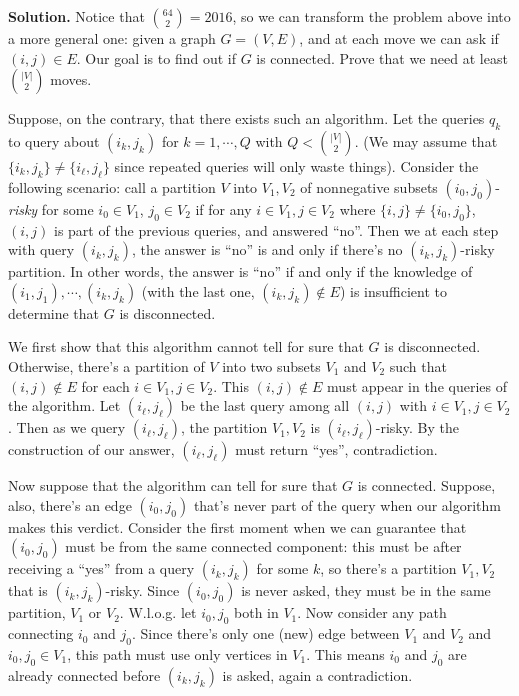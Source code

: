 \documentclass[11pt,a4paper]{article}
\begin{document}
\begin{enumerate}
	\textbf{Solution.} Notice that $\binom{64}{2}=2016$, so we can transform the problem above into a more general one: 
	given a graph $G=(V, E)$, 
	and at each move we can ask if $(i, j)\in E$. 
	Our goal is to find out if $G$ is connected. 
	Prove that we need at least $\binom{|V|}{2}$ moves. 
	
	Suppose, on the contrary, that there exists such an algorithm. 
	Let the queries $q_k$ to query about $(i_k, j_k)$ for $k=1, \cdots, Q$ with $Q<\binom{|V|}{2}$. 
	(We may assume that $\{i_k, j_k\}\neq \{i_{\ell}, j_{\ell}\}$ 
	since repeated queries will only waste things). 
	Consider the following scenario: 
	call a partition $V$ into $V_1, V_2$ of nonnegative subsets $(i_0, j_0)$-\emph{risky} for some
	$i_0\in V_1$, $j_0\in V_2$
	 if  for any $i\in V_1, j\in V_2$ where $\{i, j\}\neq \{i_0, j_0\}$, 
	 $(i, j)$ is part of the previous queries, and answered ``no''. 
	 Then we at each step with query $(i_k, j_k)$, 
	 the answer is ``no'' is and only if there's no $(i_k, j_k)$-risky partition. 
	 In other words, the answer is ``no'' if and only if the knowledge of 
	$(i_1, j_1), \cdots, (i_k, j_k)$ (with the last one, $(i_k, j_k)\not\in E$) 
	is insufficient to determine that $G$ is disconnected. 
	
	We first show that this algorithm cannot tell for sure that $G$ is disconnected. 
	Otherwise, there's a partition of $V$ into two subsets $V_1$ and $V_2$ such that 
	$(i, j)\not\in E$ for each $i\in V_1, j\in V_2$. 
	This $(i, j)\not\in E$ must appear in the queries of the algorithm. 
	Let $(i_{\ell}, j_{\ell})$ be the last query among all $(i, j)$ with $i\in V_1, j\in V_2$. 
	Then as we query $(i_{\ell}, j_{\ell})$, the partition $V_1, V_2$ is $(i_{\ell}, j_{\ell})$-risky. 
	By the construction of our answer, $(i_{\ell}, j_{\ell})$ must return ``yes'', contradiction. 
	
	Now suppose that the algorithm can tell for sure that $G$ is connected. 
	Suppose, also, there's an edge $(i_0, j_0)$ that's never part of the query when our algorithm makes this verdict. 
	Consider the first moment when we can guarantee that $(i_0, j_0)$ must be from the same connected component: 
	this must be after receiving a ``yes'' from a query $(i_k, j_k)$ for some $k$, 
	so there's a partition $V_1, V_2$ that is $(i_k, j_k)$-risky. 
	Since $(i_0, j_0)$ is never asked, they must be in the same partition, $V_1$ or $V_2$. 
	W.l.o.g. let $i_0, j_0$ both in $V_1$. 
	Now consider any path connecting $i_0$ and $j_0$. 
	Since there's only one (new) edge between $V_1$ and $V_2$ and $i_0, j_0\in V_1$, 
	this path must use only vertices in $V_1$. 
	This means $i_0$ and $j_0$ are already connected before $(i_k, j_k)$ is asked, 
	again a contradiction. 
	

\end{enumerate}
\end{document}
